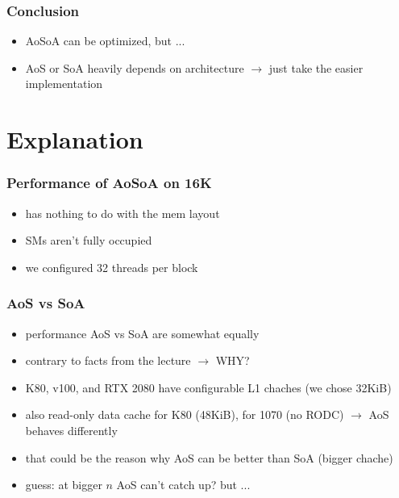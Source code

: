 \documentclass[aspectratio=169]{beamer}
\begin{document}
\begin{frame}
\end{frame}

\begin{frame}
	\frametitle{Conclusion}
	\begin{itemize}
		\item AoSoA can be optimized, but ...
		\item AoS or SoA heavily depends on architecture \(\rightarrow\) just take the easier implementation
	\end{itemize}
\end{frame}


\section{Explanation}
\begin{frame}
	\frametitle{Performance of AoSoA on 16K}
	\begin{itemize}
		\item has nothing to do with the mem layout
		\item SMs aren't fully occupied
		\item we configured 32 threads per block
	\end{itemize}
\end{frame}

\begin{frame}
	\frametitle{AoS vs SoA}
	\begin{itemize}
		\item performance AoS vs SoA are somewhat equally
		\item contrary to facts from the lecture \(\rightarrow\) WHY?
		\item K80, v100, and RTX 2080 have configurable L1 chaches (we chose 32KiB)
		\item also read-only data cache for K80 (48KiB), for 1070 (no RODC) \(\rightarrow\) AoS behaves differently
		\item that could be the reason why AoS can be better than SoA (bigger chache)
		\item guess: at bigger  \(n\) AoS can't catch up? but ...
	\end{itemize}
\end{frame}
\end{document}
